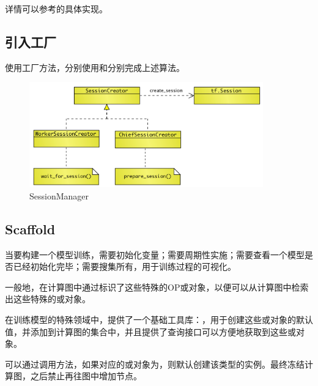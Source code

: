 \begin{content}
\begin{enum}
\end{enum}

详情可以参考的具体实现。

\subsection{引入工厂}

使用工厂方法，分别使用和分别完成上述算法。

\begin{figure}[!htbp]
\centering
\includegraphics[width=0.9\textwidth]{figures/py-train-session-creator.png}
\caption{SessionManager}
 \label{fig:py-train-session-creator}
\end{figure}

\subsection{Scaffold}

当要构建一个模型训练，需要初始化变量；需要周期性实施；需要查看一个模型是否已经初始化完毕；需要搜集所有，用于训练过程的可视化。

一般地，在计算图中通过标识了这些特殊的OP或对象，以便可以从计算图中检索出这些特殊的或对象。

在训练模型的特殊领域中，提供了一个基础工具库：，用于创建这些或对象的默认值，并添加到计算图的集合中，并且提供了查询接口可以方便地获取到这些或对象。

可以通过调用方法，如果对应的或对象为，则默认创建该类型的实例。最终冻结计算图，之后禁止再往图中增加节点。


\end{content}
